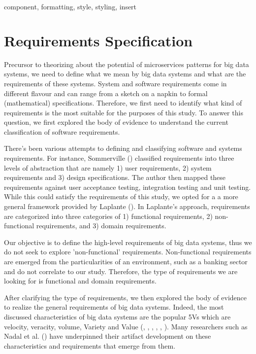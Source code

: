 \documentclass[conference]{IEEEtran}
\begin{document}
\begin{IEEEkeywords}
component, formatting, style, styling, insert
\end{IEEEkeywords}

\section{Requirements Specification}

Precursor to theorizing about the potential of microservices patterns for big data systems, we need to define what we mean by big data systems and what are the requirements of these systems. System and software requirements come in different flavour and can range from a sketch on a napkin to formal (mathematical) specifications. Therefore, we first need to identify what kind of requirements is the most suitable for the purposes of this study. To answer this question, we first explored the body of evidence to understand the current classification of software requirements. 

There's been various attempts to defining and classifying software and systems requirements. For instance, Sommerville (\cite{sommerville2011software}) classified requirements into three levels of abstraction that are namely 1) user requirements, 2) system requirements and 3) design specifications. The author then mapped these requirements against user acceptance testing, integration testing and unit testing. While this could satisfy the requirements of this study, we opted for a a more general framework provided by Laplante (\cite{laplante2017requirements}). In Laplante's approach, requirements are categorized into three categories of 1) functional requirements, 2) non-functional requirements, and 3) domain requirements. 

Our objective is to define the high-level requirements of big data systems, thus we do not seek to explore 'non-functional' requirements. Non-functional requirements are emerged from the particularities of an environment, such as a banking sector and do not correlate to our study. Therefore, the type of requirements we are looking for is functional and domain requirements.

After clarifying the type of requirements, we then explored the body of evidence to realize the general requirements of big data systems. Indeed, the most discussed characteristics of big data systems are the popular 5Vs which are velocity, veracity, volume, Variety and Value (\cite{Demchenko2014}, \cite{Bughin2016}, \cite{Bahrami2015}, \cite{rad2017big}, \cite{Marz2015}, \cite{Chen2016a} ). Many researchers such as Nadal et al. (\cite{nadal2017software}) have underpinned their artifact development on these characteristics and requirements that emerge from them. 
\end{document}
